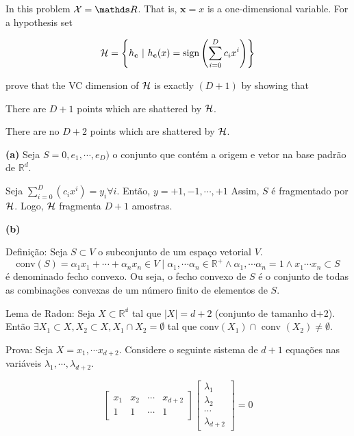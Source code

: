 \begin{enunciado}{16}
    In this problem $\xset = \conjR$. That is, $\mathbf{x} = x$ is a one-dimensional variable. For a hypothesis set
    
    $$ \mathcal{H} = \left\{ h_\mathbf{c}~|~h_\mathbf{c}(x) = \text{sign}\left(\sum\limits_{i=0}^{D} c_i x^i \right) \right\}$$
    
    prove that the VC dimension of $\mathcal{H}$ is exactly $(D + 1)$ by showing that
    
     There are $D + 1$ points which are shattered by $\mathcal{H}$.
    
     There are no $D + 2$ points which are shattered by $\mathcal{H}$.
\end{enunciado}

\textbf{(a)} Seja $S = {0,e_1, \cdots, e_D)}$ o conjunto que contém a origem e vetor na base padrão de $\mathbb{R}^{d}$.

Seja $\sum_{i = 0}^{D} (c_i x^i) = y_i \forall i$. Então, $y = {+1, -1, \cdots , +1}$
Assim, $S$ é fragmentado por $\mathcal{H}$.
Logo, $\mathcal{H}$ fragmenta $D+1$ amostras.

\cqd

\textbf{(b)}

Definição:
Seja $S \subset V$ o subconjunto de um espaço vetorial $V$.
$$\text{conv} (S) = {\alpha_1 x_1 + \cdots + \alpha_n x_n \in V \mid \alpha_1, \cdots \alpha_n \in \mathbb{R^+} \wedge \alpha_1, \cdots \alpha_n = 1 \wedge {x_1 \cdots x_n} \subset S}$$ é denominado fecho convexo.
Ou seja, o fecho convexo de $S$ é o conjunto de todas as combinações convexas de um número finito de elementos de $S$.

Lema de Radon:
Seja $X \subset \mathbb{R^d}$ tal que $\mid X\mid = d+2$ (conjunto de tamanho d+2).
Então $\exists X_1 \subset X, X_2 \subset X, X_1 \cap X_2 = \emptyset$ tal que conv$(X_1) \cap$ conv $(X_2) \neq \emptyset$.

Prova: 
Seja $X = {x_1, \cdots x_{d+2}}$. Considere o seguinte sistema de $d+1$ equações nas variáveis $\lambda_1, \cdots, \lambda_{d+2}$.


\begin{equation*}
\left[
\begin{array}{cccc}
     x_1 & x_2 & \cdots & x_{d+2} \\
     1 & 1 & \cdots & 1 
\end{array} 
\right]
\left[
\begin{array}{c}
    \lambda_1  \\
    \lambda_2 \\
    \cdots \\
    \lambda_{d+2} 
\end{array} 
\right] = 0
 \end{equation*}

